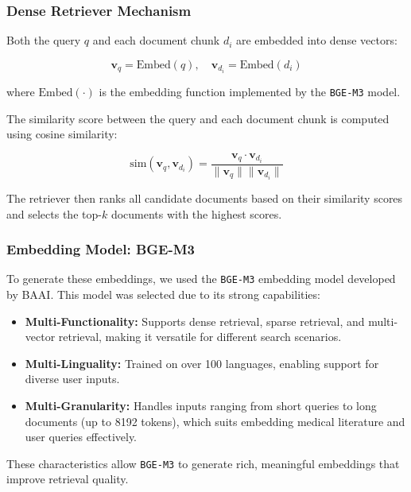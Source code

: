 \subsubsection*{Dense Retriever Mechanism}
Both the query $q$ and each document chunk $d_i$ are embedded into dense vectors:

\begin{equation*}
\mathbf{v}_q = \text{Embed}(q), \quad \mathbf{v}_{d_i} = \text{Embed}(d_i)
\end{equation*}

where $\text{Embed}(\cdot)$ is the embedding function implemented by the \texttt{BGE-M3} model.

The similarity score between the query and each document chunk is computed using cosine similarity:

\begin{equation*}
\text{sim}(\mathbf{v}_q, \mathbf{v}_{d_i}) = \frac{\mathbf{v}_q \cdot \mathbf{v}_{d_i}}{\|\mathbf{v}_q\| \|\mathbf{v}_{d_i}\|}
\end{equation*}

The retriever then ranks all candidate documents based on their similarity scores and selects the top-$k$ documents with the highest scores.

\subsubsection*{Embedding Model: BGE-M3}
To generate these embeddings, we used the \texttt{BGE-M3} embedding model developed by BAAI. This model was selected due to its strong capabilities:

\begin{itemize}
    \item \textbf{Multi-Functionality:} Supports dense retrieval, sparse retrieval, and multi-vector retrieval, making it versatile for different search scenarios.
    
    \item \textbf{Multi-Linguality:} Trained on over 100 languages, enabling support for diverse user inputs.
    
    \item \textbf{Multi-Granularity:} Handles inputs ranging from short queries to long documents (up to 8192 tokens), which suits embedding medical literature and user queries effectively.
\end{itemize}

These characteristics allow \texttt{BGE-M3} to generate rich, meaningful embeddings that improve retrieval quality.

